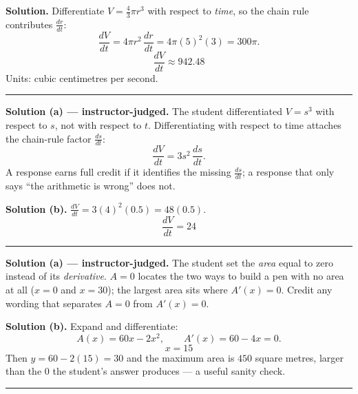\documentclass[12pt]{article}
\begin{document}



\textbf{Solution.} Differentiate $V = \frac{4}{3}\pi r^3$ with respect to
\emph{time}, so the chain rule contributes $\frac{dr}{dt}$:
\[ \frac{dV}{dt} = 4\pi r^2\,\frac{dr}{dt} = 4\pi(5)^2(3) = 300\pi. \]
\[ \boxed{\frac{dV}{dt} \approx 942.48} \]
Units: cubic centimetres per second.

\vspace{0.2cm}\noindent\rule{\linewidth}{0.2pt}


\textbf{Solution (a) --- instructor-judged.} The student differentiated
$V = s^3$ with respect to $s$, not with respect to $t$. Differentiating with
respect to time attaches the chain-rule factor $\frac{ds}{dt}$:
\[ \frac{dV}{dt} = 3s^2\,\frac{ds}{dt}. \]
A response earns full credit if it identifies the missing $\frac{ds}{dt}$; a
response that only says ``the arithmetic is wrong'' does not.

\textbf{Solution (b).} $\frac{dV}{dt} = 3(4)^2(0.5) = 48(0.5)$.
\[ \boxed{\frac{dV}{dt} = 24} \]

\vspace{0.2cm}\noindent\rule{\linewidth}{0.2pt}


\textbf{Solution (a) --- instructor-judged.} The student set the \emph{area}
equal to zero instead of its \emph{derivative}. $A = 0$ locates the two ways to
build a pen with no area at all ($x = 0$ and $x = 30$); the largest area sits
where $A'(x) = 0$. Credit any wording that separates $A = 0$ from $A'(x) = 0$.

\textbf{Solution (b).} Expand and differentiate:
\[ A(x) = 60x - 2x^2, \qquad A'(x) = 60 - 4x = 0. \]
\[ \boxed{x = 15} \]
Then $y = 60 - 2(15) = 30$ and the maximum area is $450$ square metres, larger
than the $0$ the student's answer produces --- a useful sanity check.

\vspace{0.2cm}\noindent\rule{\linewidth}{0.2pt}
\end{document}
